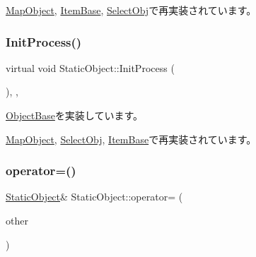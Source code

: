 \mbox{\hyperlink{class_map_object_ad4bcfdc33bd945a9aa5e50a57c2704bc}{Map\+Object}}, \mbox{\hyperlink{class_item_base_ab34d53b8f3442da77466ba1b9132386e}{Item\+Base}}, \mbox{\hyperlink{class_select_obj_ad3a5fdc41a9e5753f99bae7ad289888f}{Select\+Obj}}で再実装されています。

\mbox{\label{class_static_object_afa0709f50495338a23c1140062a567af}} 
\subsubsection{\texorpdfstring{Init\+Process()}{InitProcess()}}
{\footnotesize\ttfamily virtual void Static\+Object\+::\+Init\+Process (\begin{DoxyParamCaption}{ }\end{DoxyParamCaption})\hspace{0.3cm}{\ttfamily [inline]}, {\ttfamily [protected]}, {\ttfamily [virtual]}}



\mbox{\hyperlink{class_object_base_af133f36f2bca1dcfd962e2cfac61ab51}{Object\+Base}}を実装しています。



\mbox{\hyperlink{class_map_object_a3043cddb8aaad0eab27a076e9bee0284}{Map\+Object}}, \mbox{\hyperlink{class_select_obj_a09c9e1a54f4605eda5bb6e18887c2654}{Select\+Obj}}, \mbox{\hyperlink{class_item_base_a772804cb3c663b35e44d49913d1f1cef}{Item\+Base}}で再実装されています。

\mbox{\label{class_static_object_aa2a0526bd19e479ea4d1e5da236c1bf3}} 
\subsubsection{\texorpdfstring{operator=()}{operator=()}}
{\footnotesize\ttfamily \mbox{\hyperlink{class_static_object}{Static\+Object}}\& Static\+Object\+::operator= (\begin{DoxyParamCaption}\item[{const \mbox{\hyperlink{class_static_object}{Static\+Object}} \&}]{other }\end{DoxyParamCaption})\hspace{0.3cm}{\ttfamily [inline]}}



